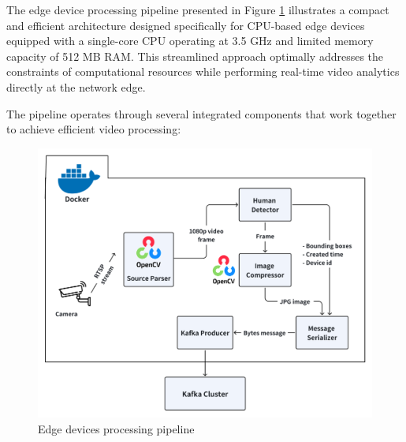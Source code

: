 The edge device processing pipeline presented in Figure \ref{fig:edges} illustrates a compact and efficient architecture designed specifically for CPU-based edge devices equipped with a single-core CPU operating at 3.5 GHz and limited memory capacity of 512 MB RAM. This streamlined approach optimally addresses the constraints of computational resources while performing real-time video analytics directly at the network edge.

The pipeline operates through several integrated components that work together to achieve efficient video processing:

\newpage

\begin{figure}[htbp]
    \centering
    \includegraphics[width=1\textwidth]{Figure/edges.png}
    \caption{Edge devices processing pipeline}
    \label{fig:edges}
\end{figure}

